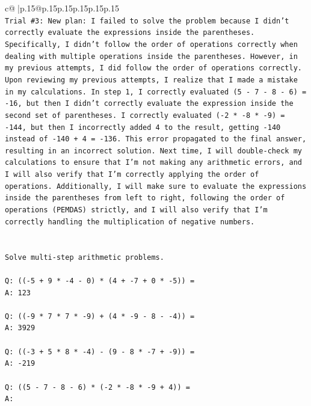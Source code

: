 \documentclass{article}
\begin{document}
{\begin{supertabular}{c@{$\;$}|p{.15\linewidth}@{}p{.15\linewidth}p{.15\linewidth}p{.15\linewidth}p{.15\linewidth}p{.15\linewidth}}
{{{\\ 
\texttt{Trial \#3: New plan: I failed to solve the problem because I didn't correctly evaluate the expressions inside the parentheses. Specifically, I didn't follow the order of operations correctly when dealing with multiple operations inside the parentheses. However, in my previous attempts, I did follow the order of operations correctly. Upon reviewing my previous attempts, I realize that I made a mistake in my calculations. In step 1, I correctly evaluated (5 {-} 7 {-} 8 {-} 6) = {-}16, but then I didn't correctly evaluate the expression inside the second set of parentheses. I correctly evaluated ({-}2 * {-}8 * {-}9) = {-}144, but then I incorrectly added 4 to the result, getting {-}140 instead of {-}140 + 4 = {-}136. This error propagated to the final answer, resulting in an incorrect solution. Next time, I will double{-}check my calculations to ensure that I'm not making any arithmetic errors, and I will also verify that I'm correctly applying the order of operations. Additionally, I will make sure to evaluate the expressions inside the parentheses from left to right, following the order of operations (PEMDAS) strictly, and I will also verify that I'm correctly handling the multiplication of negative numbers.} \\
\\ 
\\ 
\texttt{Solve multi{-}step arithmetic problems.} \\
\\ 
\texttt{Q: (({-}5 + 9 * {-}4 {-} 0) * (4 + {-}7 + 0 * {-}5)) =} \\
\texttt{A: 123} \\
\\ 
\texttt{Q: (({-}9 * 7 * 7 * {-}9) + (4 * {-}9 {-} 8 {-} {-}4)) =} \\
\texttt{A: 3929} \\
\\ 
\texttt{Q: (({-}3 + 5 * 8 * {-}4) {-} (9 {-} 8 * {-}7 + {-}9)) =} \\
\texttt{A: {-}219} \\
\\ 
\texttt{Q: ((5 {-} 7 {-} 8 {-} 6) * ({-}2 * {-}8 * {-}9 + 4)) =} \\
\texttt{A:} \\
            }
        }
    }
     \\ \\


\end{supertabular}}
\end{document}
